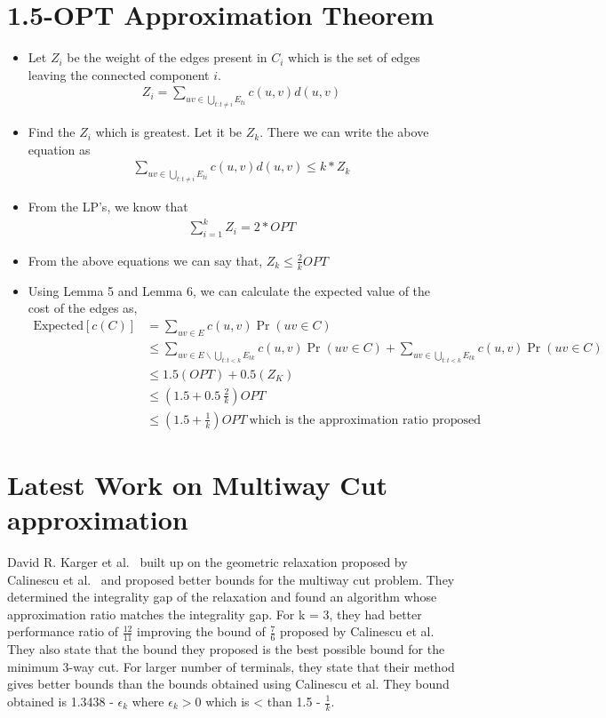 \documentclass[11pt]{article}
\begin{document}
\section{1.5-OPT Approximation Theorem} 
\begin{itemize} \itemsep -3pt
    \item Let $Z_i$ be the weight of the edges present in $C_i$ which is the set of edges leaving the connected component $i$. 
        \begin{align*}
            Z_i = \sum\limits_{uv \in \bigcup\limits_{t:t \ne i}{E_{ti}}}{c(u,v)d(u,v)}
        \end{align*}
    \item Find the $Z_i$ which is greatest. Let it be $Z_k$. There we can write the above equation as 
        \begin{align*}
            \sum\limits_{uv \in \bigcup\limits_{t:t \ne i}{E_{ti}}}{c(u,v)d(u,v)} \le k * Z_k
        \end{align*}
    \item From the LP's, we know that
        \begin{align*}
            \sum\limits_{i = 1}^{k}{Z_i} = 2 * OPT
        \end{align*}
    \item From the above equations we can say that, $Z_k \le \frac{2}{k} OPT$ 
    \item Using Lemma 5 and Lemma 6, we can calculate the expected value of the cost of the edges as,
        \begin{align*}
            \text{Expected}[c(C)] &= \sum\limits_{uv \in E}{c(u,v) \Pr(uv \in C)}\\
            &\le \sum\limits_{uv \in E \backslash \bigcup\limits_{t:t<k}{E_{tk}}}{c(u,v) \Pr(uv \in C)} + \sum\limits_{uv \in \bigcup\limits_{t:t<k}{E_{tk}}}{c(u,v) \Pr(uv \in C)} \\
            &\le 1.5 (OPT) + 0.5(Z_K)\\
            &\le (1.5 + 0.5 \ \frac{2}{k})OPT\\
            &\le (1.5 + \frac{1}{k})OPT \ \text{which is the approximation ratio proposed}
        \end{align*}
\end{itemize}


\section{Latest Work on Multiway Cut approximation}
David R. Karger et al.~\cite{Karger_current} built up on the geometric relaxation proposed by Calinescu et al.~\cite{Dahlhaus} and proposed better bounds for the multiway cut problem. They determined the integrality gap of the relaxation and found an algorithm whose approximation ratio matches the integrality gap. For k = 3, they had better performance ratio of $\frac{12}{11}$ improving the bound of $\frac{7}{6}$ proposed by Calinescu et al. They also state that the bound they proposed is the best possible bound for the minimum 3-way cut. For larger number of terminals, they state that their method gives better bounds than the bounds obtained using Calinescu et al. They bound obtained is 1.3438 - $\epsilon_k$ where $\epsilon_k > 0$ which is < than 1.5 - $\frac{1}{k}$. 
\end{document}
